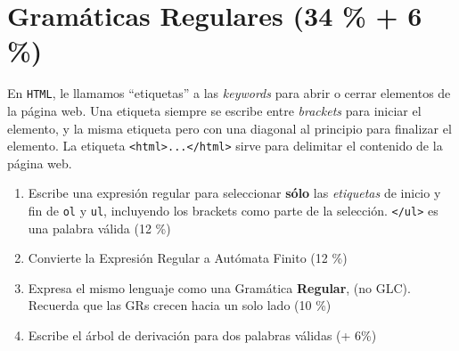 \documentclass[8pt, onside]{article}
\begin{document}
\section{Gramáticas Regulares (34 \% + 6 \%)}

En \texttt{HTML}, le llamamos ``etiquetas'' a las \textit{keywords} para abrir o cerrar elementos de la página web.
Una etiqueta siempre se escribe entre \textit{brackets} para iniciar el elemento, y la misma etiqueta pero con una diagonal al principio para finalizar el elemento.
La etiqueta \verb|<html>...</html>| sirve para delimitar el contenido de la página web.

\begin{enumerate}[label=\tt \alph*)]
    \itemsep0em
    \item Escribe una expresión regular para seleccionar \textbf{sólo} las \textit{etiquetas} de inicio y fin de \texttt{ol} y \texttt{ul}, incluyendo los brackets como parte de la selección. \texttt{</ul>} es una palabra válida (12 \%)
    \item Convierte la Expresión Regular a Autómata Finito (12 \%)
    \item Expresa el mismo lenguaje como una Gramática \textbf{Regular}, (no GLC). Recuerda que las GRs crecen hacia un solo lado (10 \%)
    \item Escribe el árbol de derivación para dos palabras válidas (+ 6\%)
\end{enumerate}


\begin{comment}
\section{Ambigüedad en GLCs (20\%)}

Sea $G=(\{S\},\{\mathtt{if}, c, \mathtt{then}, \mathtt{else}, x\}, \{S \to x, S \to \mathtt{if} \, c \, \mathtt{then} \, S, S \to \mathtt{if} \, c \, \mathtt{then} \, S \, \mathtt{else} \, S\}, S)$ una gramática libre de contexto. Recuerda que las gramáticas vienen de la forma $G = (V, \Sigma, R, S)$.

\begin{enumerate}[label=\tt \alph*)]
    \item Demuestra que $G$ es ambigua. Para eso, encuentra una palabra a la cual puedas llegar utilizando dos árboles de derivación distintos. $\mathtt{if} \, c \, \mathtt{then} \, x$ es una palabra válida (10 \%)
    \item Expresa cada árbol de derivación en forma lineal (la que usa $\implies$) (10 \%)
\end{enumerate}
\end{comment}
\end{document}
